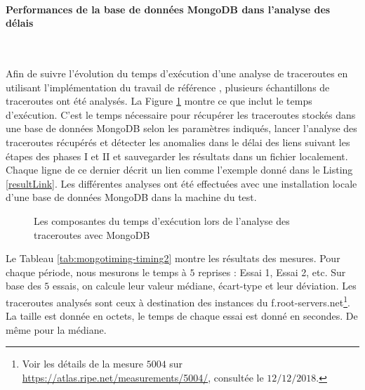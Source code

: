 \paragraph{Performances de la base de données MongoDB dans l'analyse des délais }~

Afin de suivre l'évolution du  temps d'exécution d'une analyse de traceroutes en utilisant l'implémentation du travail de référence \cite{InternetHealthReport}, plusieurs échantillons de traceroutes ont été analysés.
La Figure \ref{fig:mongodbmesuretime} montre ce que inclut le temps d'exécution. C'est le temps nécessaire pour récupérer les traceroutes stockés dans une base de données MongoDB selon les paramètres indiqués,  lancer  l'analyse des traceroutes récupérés et détecter les anomalies dans le délai des liens
 suivant les étapes des  phases I et II et  sauvegarder les résultats dans un fichier localement. Chaque ligne de ce dernier  décrit un lien comme l'exemple donné dans le Listing \ref{resultLink}. 
Les différentes analyses ont été effectuées avec une installation locale  d'une base de données MongoDB dans la machine du test.
\begin{figure}[H]
	\centering
	\captionsetup{justification=centering}
	\resizebox{\textwidth}{!}{
		
	}
	\caption{Les composantes du temps d'exécution lors de l'analyse des traceroutes avec MongoDB }
	\label{fig:mongodbmesuretime}
\end{figure}


 

Le Tableau \ref{tab:mongotiming-timing2} montre les résultats des mesures. Pour chaque période, nous mesurons le temps à  $5$ reprises
: Essai 1, Essai 2, etc. Sur base des $5$ essais, on calcule leur valeur médiane, écart-type et leur déviation.
 Les traceroutes analysés sont ceux à destination des instances du f.root-servers.net\footnote{Voir les détails de la mesure $ 5004 $ sur \url{https://atlas.ripe.net/measurements/5004/}, consultée le $12/12/2018$.}. La taille est donnée en octets, le temps de chaque essai est donné en secondes. De même pour la médiane.

